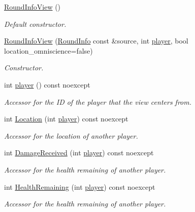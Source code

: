 \begin{DoxyCompactItemize}
\item 
\hyperlink{classroundinfo_1_1_round_info_view_a29937c9ac9cd71b7edd10f612ce76c91}{Round\+Info\+View} ()
\begin{DoxyCompactList}\small\item\em Default constructor. \end{DoxyCompactList}\item 
\hyperlink{classroundinfo_1_1_round_info_view_a8c5bca173f30cc869505c36baf04ebaa}{Round\+Info\+View} (\hyperlink{classroundinfo_1_1_round_info}{Round\+Info} const \&source, int \hyperlink{classroundinfo_1_1_round_info_view_acb1e4edcbe9b01f59ba26542f528ba24}{player}, bool location\+\_\+omniscience=false)
\begin{DoxyCompactList}\small\item\em Constructor. \end{DoxyCompactList}\item 
int \hyperlink{classroundinfo_1_1_round_info_view_acb1e4edcbe9b01f59ba26542f528ba24}{player} () const noexcept
\begin{DoxyCompactList}\small\item\em Accessor for the ID of the player that the view centers from. \end{DoxyCompactList}\item 
int \hyperlink{classroundinfo_1_1_round_info_view_a05f42a982570552bbeb8c330e62437ad}{Location} (int \hyperlink{classroundinfo_1_1_round_info_view_acb1e4edcbe9b01f59ba26542f528ba24}{player}) const noexcept
\begin{DoxyCompactList}\small\item\em Accessor for the location of another player. \end{DoxyCompactList}\item 
int \hyperlink{classroundinfo_1_1_round_info_view_ac2d60e02ab84297d958b5b5caa653c7b}{Damage\+Received} (int \hyperlink{classroundinfo_1_1_round_info_view_acb1e4edcbe9b01f59ba26542f528ba24}{player}) const noexcept
\begin{DoxyCompactList}\small\item\em Accessor for the health remaining of another player. \end{DoxyCompactList}\item 
int \hyperlink{classroundinfo_1_1_round_info_view_a5b7dd1135b438e04017ad0a3bcc4034a}{Health\+Remaining} (int \hyperlink{classroundinfo_1_1_round_info_view_acb1e4edcbe9b01f59ba26542f528ba24}{player}) const noexcept
\begin{DoxyCompactList}\small\item\em Accessor for the health remaining of another player. \end{DoxyCompactList}\item 

\end{DoxyCompactItemize}
